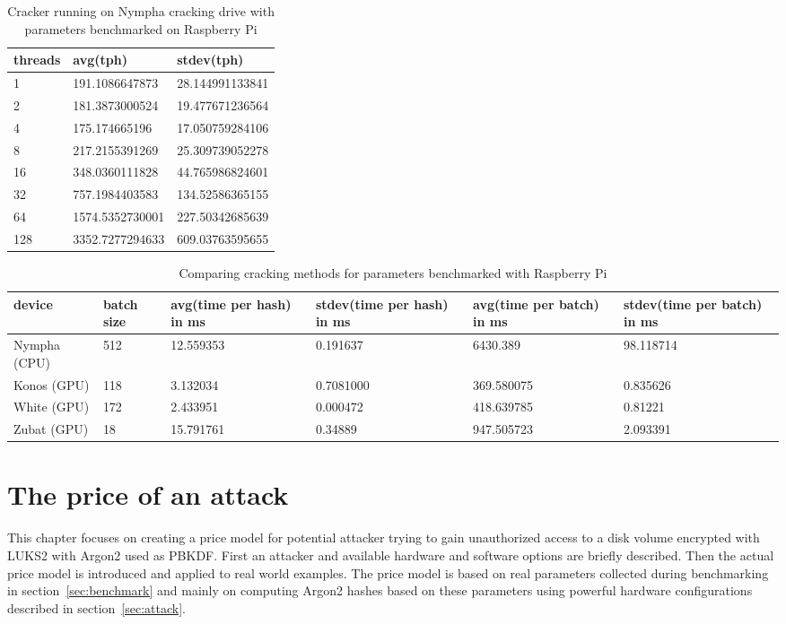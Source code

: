 \documentclass[nolof]{fithesis3}
\begin{document}
\noindent
\begin{table}
\caption{Cracker running on Nympha cracking drive with parameters benchmarked on Raspberry Pi}
\label{tab:nymphacrackerrpi}
\begin{tabularx}{\textwidth}{| X | X | X |}
\hline
threads & avg(tph) & stdev(tph)\\
\hline
1 & 191.1086647873 & 28.144991133841\\
\hline
2 & 181.3873000524 & 19.477671236564\\
\hline
4 & 175.174665196 & 17.050759284106\\
\hline
8 & 217.2155391269 & 25.309739052278\\
\hline
16 & 348.0360111828 & 44.765986824601\\
\hline
32 & 757.1984403583 & 134.52586365155\\
\hline
64 & 1574.5352730001 & 227.50342685639\\
\hline
128 & 3352.7277294633 & 609.03763595655\\
\hline
\end{tabularx}
\end{table}

\noindent
\begin{table}
\caption{Comparing cracking methods for parameters benchmarked with Raspberry Pi}
\label{tab:rpicrack}
\begin{tabularx}{\textwidth}{| X | X | X | X | X | X |}
\hline
device & batch size & avg(time per hash) in ms & stdev(time per hash) in ms & avg(time per batch) in ms & stdev(time per batch) in ms\\
\hline
Nympha (CPU) & 512 & 12.559353 & 0.191637 & 6430.389 & 98.118714\\
\hline
Konos (GPU) & 118 & 3.132034 & 0.7081000 & 369.580075 & 0.835626\\
\hline
White (GPU) & 172 & 2.433951 & 0.000472 & 418.639785 & 0.81221\\
\hline
Zubat (GPU) & 18 & 15.791761 & 0.34889 & 947.505723 & 2.093391\\
\hline
\end{tabularx}
\end{table}



\chapter{The price of an attack}
\label{chap:model}
This chapter focuses on creating a price model for potential attacker trying to gain unauthorized access to a disk volume encrypted with LUKS2 with Argon2 used as PBKDF. First an attacker and available hardware and software options are briefly described. Then the actual price model is introduced and applied to real world examples. The price model is based on real parameters collected during benchmarking in section~\ref{sec:benchmark} and mainly on computing Argon2 hashes based on these parameters using powerful hardware configurations described in section~\ref{sec:attack}.
\end{document}
